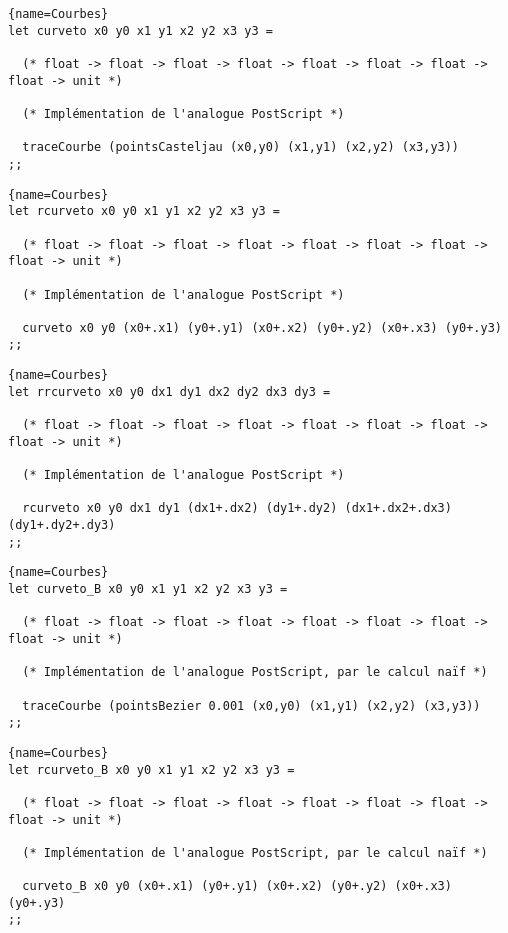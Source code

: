 \documentclass[10pt,twoside,a4paper]{article}
\begin{document}
\begin{lstlisting}{name=Courbes}
let curveto x0 y0 x1 y1 x2 y2 x3 y3 =

  (* float -> float -> float -> float -> float -> float -> float -> float -> unit *)

  (* Implémentation de l'analogue PostScript *)
  
  traceCourbe (pointsCasteljau (x0,y0) (x1,y1) (x2,y2) (x3,y3))
;;
\end{lstlisting}

\begin{lstlisting}{name=Courbes}
let rcurveto x0 y0 x1 y1 x2 y2 x3 y3 =

  (* float -> float -> float -> float -> float -> float -> float -> float -> unit *)

  (* Implémentation de l'analogue PostScript *)
  
  curveto x0 y0 (x0+.x1) (y0+.y1) (x0+.x2) (y0+.y2) (x0+.x3) (y0+.y3)
;;
\end{lstlisting}

\begin{lstlisting}{name=Courbes}
let rrcurveto x0 y0 dx1 dy1 dx2 dy2 dx3 dy3 =

  (* float -> float -> float -> float -> float -> float -> float -> float -> unit *)

  (* Implémentation de l'analogue PostScript *)
  
  rcurveto x0 y0 dx1 dy1 (dx1+.dx2) (dy1+.dy2) (dx1+.dx2+.dx3) (dy1+.dy2+.dy3)
;;
\end{lstlisting}

\begin{lstlisting}{name=Courbes}
let curveto_B x0 y0 x1 y1 x2 y2 x3 y3 =

  (* float -> float -> float -> float -> float -> float -> float -> float -> unit *)

  (* Implémentation de l'analogue PostScript, par le calcul naïf *)
  
  traceCourbe (pointsBezier 0.001 (x0,y0) (x1,y1) (x2,y2) (x3,y3))
;;
\end{lstlisting}

\begin{lstlisting}{name=Courbes}
let rcurveto_B x0 y0 x1 y1 x2 y2 x3 y3 =

  (* float -> float -> float -> float -> float -> float -> float -> float -> unit *)

  (* Implémentation de l'analogue PostScript, par le calcul naïf *)
  
  curveto_B x0 y0 (x0+.x1) (y0+.y1) (x0+.x2) (y0+.y2) (x0+.x3) (y0+.y3)
;;
\end{lstlisting}
\end{document}
